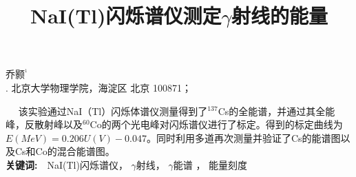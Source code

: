 \documentclass[a4paper,10.0pt,twoside]{npr}
\begin{document}
\setcounter{page}{001}%
\begin{center}
\title{%
\xiaoerhao \bf  %
NaI(Tl)闪烁谱仪测定$\gamma$射线的能量\\[-5mm]}
\maketitle
\large \fs
乔颢$^{^1}$\\[2mm]

\xiaowu {}. 北京大学物理学院，海淀区 北京 100871；\\[4mm]

 

\parbox{158mm} {
~~\fs
该实验通过NaI（Tl）闪烁体谱仪测量得到了$^{137}$Cs的全能谱，并通过其全能峰，反散射峰以及$^{60}$Co的两个光电峰对闪烁谱仪进行了标定。得到的标定曲线为$  E(MeV) = 0.206 U(V) - 0.047 $。同时利用多道再次测量并验证了Cs的能谱图以及Cs和Co的混合能谱图。\\

{\bf 关键词:}~~\fs NaI(Tl)闪烁谱仪， $\gamma$射线， $\gamma$能谱 ， 能量刻度}\\
\end{center}
\vspace{5mm}
\setcounter{section}{0}
\end{document}

